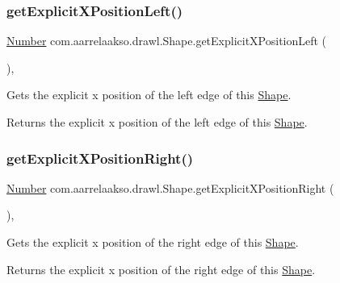 \subsubsection{\texorpdfstring{get\+Explicit\+X\+Position\+Left()}{getExplicitXPositionLeft()}}
{\footnotesize\ttfamily \hyperlink{interfacecom_1_1aarrelaakso_1_1drawl_1_1_number}{Number} com.\+aarrelaakso.\+drawl.\+Shape.\+get\+Explicit\+X\+Position\+Left (\begin{DoxyParamCaption}{ }\end{DoxyParamCaption})\hspace{0.3cm}{\ttfamily [protected]}, {\ttfamily [inherited]}}



Gets the explicit x position of the left edge of this \hyperlink{classcom_1_1aarrelaakso_1_1drawl_1_1_shape}{Shape}. 

\begin{DoxyReturn}{Returns}
the explicit x position of the left edge of this \hyperlink{classcom_1_1aarrelaakso_1_1drawl_1_1_shape}{Shape}. 
\end{DoxyReturn}
\mbox{\label{classcom_1_1aarrelaakso_1_1drawl_1_1_shape_a86920ba43a76d5a02977e5f9ea3509ac}} 
\subsubsection{\texorpdfstring{get\+Explicit\+X\+Position\+Right()}{getExplicitXPositionRight()}}
{\footnotesize\ttfamily \hyperlink{interfacecom_1_1aarrelaakso_1_1drawl_1_1_number}{Number} com.\+aarrelaakso.\+drawl.\+Shape.\+get\+Explicit\+X\+Position\+Right (\begin{DoxyParamCaption}{ }\end{DoxyParamCaption})\hspace{0.3cm}{\ttfamily [protected]}, {\ttfamily [inherited]}}



Gets the explicit x position of the right edge of this \hyperlink{classcom_1_1aarrelaakso_1_1drawl_1_1_shape}{Shape}. 

\begin{DoxyReturn}{Returns}
the explicit x position of the right edge of this \hyperlink{classcom_1_1aarrelaakso_1_1drawl_1_1_shape}{Shape}. 
\end{DoxyReturn}
\mbox{\label{classcom_1_1aarrelaakso_1_1drawl_1_1_shape_a28b8e03381be6afdc7c5c8da48c80afe}} 

